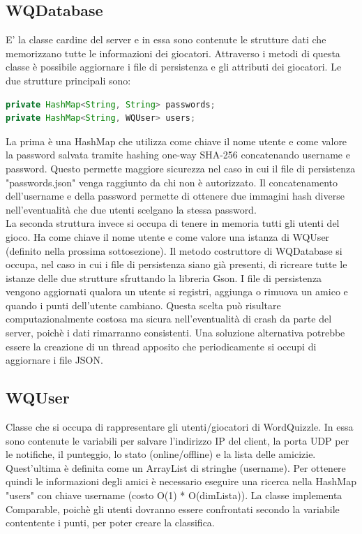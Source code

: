 \documentclass{article}
\begin{document}
\subsection{WQDatabase}
E' la classe cardine del server e in essa sono contenute le strutture dati che memorizzano tutte le informazioni dei giocatori. Attraverso i metodi di questa classe è possibile aggiornare i file di persistenza e gli attributi dei giocatori. Le due strutture principali sono:
\begin{lstlisting}[language=Java]
private HashMap<String, String> passwords;
private HashMap<String, WQUser> users;
\end{lstlisting}
La prima è una HashMap che utilizza come chiave il nome utente e come valore la password salvata tramite hashing one-way SHA-256 concatenando username e password. Questo permette maggiore sicurezza nel caso in cui il file di persistenza "passwords.json" venga raggiunto da chi non è autorizzato. Il concatenamento dell'username e della password permette di ottenere due immagini hash diverse nell'eventualità che due utenti scelgano la stessa password. \\
La seconda struttura invece si occupa di tenere in memoria tutti gli utenti del gioco. Ha come chiave il nome utente e come valore una istanza di WQUser (definito nella prossima sottosezione). 
Il metodo costruttore di WQDatabase si occupa, nel caso in cui i file di persistenza siano già presenti, di ricreare tutte le istanze delle due strutture sfruttando la libreria Gson. I file di persistenza vengono aggiornati qualora un utente si registri, aggiunga o rimuova un amico e quando i punti dell'utente cambiano. Questa scelta può risultare computazionalmente costosa ma sicura nell'eventualità di crash da parte del server, poichè i dati rimarranno consistenti. Una soluzione alternativa potrebbe essere la creazione di un thread apposito che periodicamente si occupi di aggiornare i file JSON.

\subsection{WQUser}
Classe che si occupa di rappresentare gli utenti/giocatori di WordQuizzle. In essa sono contenute le variabili per salvare l'indirizzo IP del client, la porta UDP per le notifiche, il punteggio, lo stato (online/offline) e la lista delle amicizie. Quest'ultima è definita come un ArrayList di stringhe (username). Per ottenere quindi le informazioni degli amici è necessario eseguire una ricerca nella HashMap "users" con chiave username (costo O(1) * O(dimLista)). La classe implementa Comparable, poichè gli utenti dovranno essere confrontati secondo la variabile contentente i punti, per poter creare la classifica.
\end{document}
